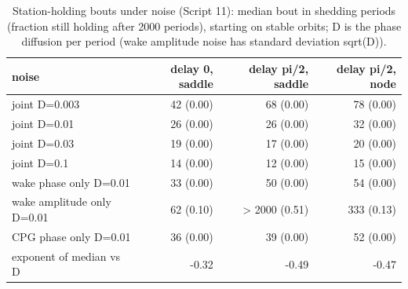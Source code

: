 \begin{table}
\caption{Station-holding bouts under noise (Script 11): median bout in shedding periods (fraction still holding after 2000 periods), starting on stable orbits; D is the phase diffusion per period (wake amplitude noise has standard deviation sqrt(D)).}
\label{tab:T6_bouts}
\begin{ruledtabular}
\begin{tabular}{lrrr}
noise & delay 0, saddle & delay pi/2, saddle & delay pi/2, node \\
\hline
joint D=0.003 & 42 (0.00) & 68 (0.00) & 78 (0.00) \\
joint D=0.01 & 26 (0.00) & 26 (0.00) & 32 (0.00) \\
joint D=0.03 & 19 (0.00) & 17 (0.00) & 20 (0.00) \\
joint D=0.1 & 14 (0.00) & 12 (0.00) & 15 (0.00) \\
wake phase only D=0.01 & 33 (0.00) & 50 (0.00) & 54 (0.00) \\
wake amplitude only D=0.01 & 62 (0.10) & > 2000 (0.51) & 333 (0.13) \\
CPG phase only D=0.01 & 36 (0.00) & 39 (0.00) & 52 (0.00) \\
exponent of median vs D & -0.32 & -0.49 & -0.47 \\
\end{tabular}
\end{ruledtabular}
\end{table}